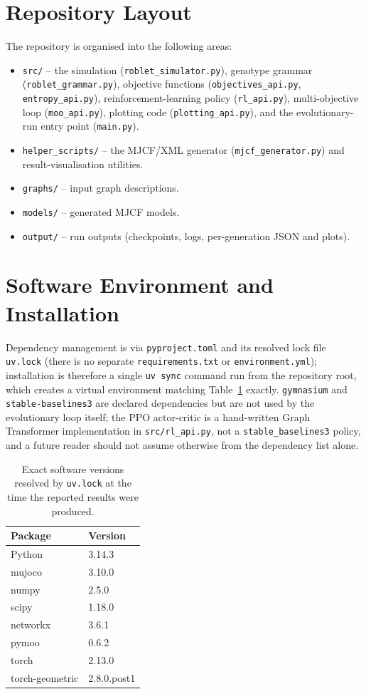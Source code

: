 \documentclass[12pt,a4paper]{report}
\begin{document}
\section{Repository Layout}
\label{app:layout}
The repository is organised into the following areas:
\begin{itemize}
    \item \texttt{src/} -- the simulation (\texttt{roblet\_simulator.py}), genotype grammar (\texttt{roblet\_grammar.py}), objective functions (\texttt{objectives\_api.py}, \texttt{entropy\_api.py}), reinforcement-learning policy (\texttt{rl\_api.py}), multi-objective loop (\texttt{moo\_api.py}), plotting code (\texttt{plotting\_api.py}), and the evolutionary-run entry point (\texttt{main.py}).
    \item \texttt{helper\_scripts/} -- the MJCF/XML generator (\texttt{mjcf\_generator.py}) and result-visualisation utilities.
    \item \texttt{graphs/} -- input graph descriptions.
    \item \texttt{models/} -- generated MJCF models.
    \item \texttt{output/} -- run outputs (checkpoints, logs, per-generation JSON and plots).
\end{itemize}

\section{Software Environment and Installation}
\label{app:install}
Dependency management is via \texttt{pyproject.toml} and its resolved lock file \texttt{uv.lock} (there is no separate \texttt{requirements.txt} or \texttt{environment.yml}); installation is therefore a single \texttt{uv sync} command run from the repository root, which creates a virtual environment matching Table~\ref{tab:software-versions} exactly. \texttt{gymnasium} and \texttt{stable-baselines3} are declared dependencies but are not used by the evolutionary loop itself; the PPO actor-critic is a hand-written Graph Transformer implementation in \texttt{src/rl\_api.py}, not a \texttt{stable\_baselines3} policy, and a future reader should not assume otherwise from the dependency list alone.

\begin{table}[htbp]
\centering
\footnotesize
\caption{Exact software versions resolved by \texttt{uv.lock} at the time the reported results were produced.}
\label{tab:software-versions}
\begin{tabular}{@{}ll@{}}
\toprule
\textbf{Package} & \textbf{Version} \\
\midrule
Python & 3.14.3 \\
mujoco & 3.10.0 \\
numpy & 2.5.0 \\
scipy & 1.18.0 \\
networkx & 3.6.1 \\
pymoo & 0.6.2 \\
torch & 2.13.0 \\
torch-geometric & 2.8.0.post1 \\
\bottomrule
\end{tabular}
\end{table}
\end{document}
